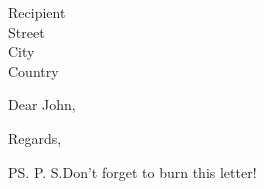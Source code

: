\documentclass{letter}  %
\date{Location, \today}
\begin{document}
	
\begin{letter}{Recipient \\ Street \\ City \\ Country}

\opening{Dear John,}

\lipsum[1]

\closing{Regards,}



\ps{P. S.}{Don't forget to burn this letter!}

\end{letter}
\end{document}
